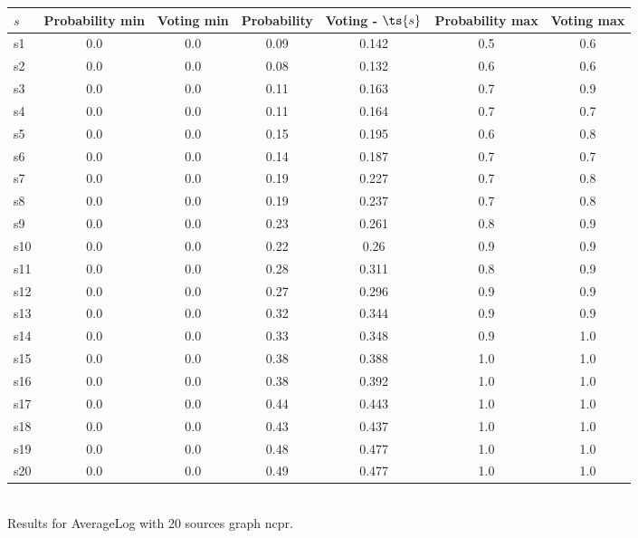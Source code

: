 \documentclass{article}
\begin{document}
\noindent\begin{tabular}{|l|c|c|c|c|c|c|}
\hline
$s$& Probability min & Voting min & Probability & Voting - $\ts{s}$ & Probability max & Voting max\\
\hline
s1 &0.0 & 0.0 & 0.09 & 0.142 & 0.5 & 0.6\\
\hline
s2 &0.0 & 0.0 & 0.08 & 0.132 & 0.6 & 0.6\\
\hline
s3 &0.0 & 0.0 & 0.11 & 0.163 & 0.7 & 0.9\\
\hline
s4 &0.0 & 0.0 & 0.11 & 0.164 & 0.7 & 0.7\\
\hline
s5 &0.0 & 0.0 & 0.15 & 0.195 & 0.6 & 0.8\\
\hline
s6 &0.0 & 0.0 & 0.14 & 0.187 & 0.7 & 0.7\\
\hline
s7 &0.0 & 0.0 & 0.19 & 0.227 & 0.7 & 0.8\\
\hline
s8 &0.0 & 0.0 & 0.19 & 0.237 & 0.7 & 0.8\\
\hline
s9 &0.0 & 0.0 & 0.23 & 0.261 & 0.8 & 0.9\\
\hline
s10 &0.0 & 0.0 & 0.22 & 0.26 & 0.9 & 0.9\\
\hline
s11 &0.0 & 0.0 & 0.28 & 0.311 & 0.8 & 0.9\\
\hline
s12 &0.0 & 0.0 & 0.27 & 0.296 & 0.9 & 0.9\\
\hline
s13 &0.0 & 0.0 & 0.32 & 0.344 & 0.9 & 0.9\\
\hline
s14 &0.0 & 0.0 & 0.33 & 0.348 & 0.9 & 1.0\\
\hline
s15 &0.0 & 0.0 & 0.38 & 0.388 & 1.0 & 1.0\\
\hline
s16 &0.0 & 0.0 & 0.38 & 0.392 & 1.0 & 1.0\\
\hline
s17 &0.0 & 0.0 & 0.44 & 0.443 & 1.0 & 1.0\\
\hline
s18 &0.0 & 0.0 & 0.43 & 0.437 & 1.0 & 1.0\\
\hline
s19 &0.0 & 0.0 & 0.48 & 0.477 & 1.0 & 1.0\\
\hline
s20 &0.0 & 0.0 & 0.49 & 0.477 & 1.0 & 1.0\\
\hline
\end{tabular}\\

\noindent Results for AverageLog with 20 sources graph ncpr.
\end{document}
